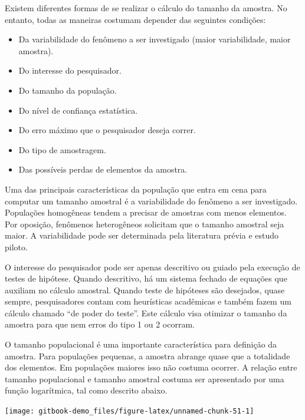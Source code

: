\documentclass[
]{book}
\providecommand{\tightlist}{%
  \setlength{\itemsep}{0pt}\setlength{\parskip}{0pt}}
\begin{document}
Existem diferentes formas de se realizar o cálculo do tamanho da
amostra. No entanto, todas as maneiras costumam depender das seguintes
condições:

\begin{itemize}
\tightlist
\item
  Da variabilidade do fenômeno a ser investigado (maior variabilidade,
  maior amostra).\\
\item
  Do interesse do pesquisador.\\
\item
  Do tamanho da população.\\
\item
  Do nível de confiança estatística.\\
\item
  Do erro máximo que o pesquisador deseja correr.\\
\item
  Do tipo de amostragem.
\item
  Das possíveis perdas de elementos da amostra.
\end{itemize}

Uma das principais características da população que entra em cena para
computar um tamanho amostral é a variabilidade do fenômeno a ser
investigado. Populações homogêneas tendem a precisar de amostras com
menos elementos. Por oposição, fenômenos heterogêneos solicitam que o
tamanho amostral seja maior. A variabilidade pode ser determinada pela
literatura prévia e estudo piloto.

O interesse do pesquisador pode ser apenas descritivo ou guiado pela
execução de testes de hipótese. Quando descritivo, há um sistema fechado
de equações que auxiliam no cálculo amostral. Quando teste de hipóteses
são desejados, quase sempre, pesquisadores contam com heurísticas
acadêmicas e também fazem um cálculo chamado ``de poder do teste''. Este
cálculo visa otimizar o tamanho da amostra para que nem erros do tipo 1
ou 2 ocorram.

O tamanho populacional é uma importante característica para definição da
amostra. Para populações pequenas, a amostra abrange quase que a
totalidade dos elementos. Em populações maiores isso não costuma
ocorrer. A relação entre tamanho populacional e tamanho amostral costuma
ser apresentado por uma função logarítmica, tal como descrito abaixo.

\begin{center}\texttt{[image: gitbook-demo\_files/figure-latex/unnamed-chunk-51-1]} \end{center}
\end{document}
